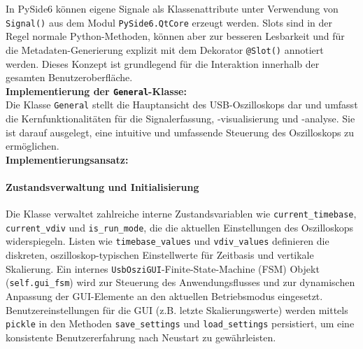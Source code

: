 \documentclass[a4paper, portrait, 12pt]{scrartcl} %
\begin{document}
In PySide6 können eigene Signale als Klassenattribute unter Verwendung von \texttt{Signal()} aus dem Modul \texttt{PySide6.QtCore} erzeugt werden. Slots sind in der Regel normale Python-Methoden, können aber zur besseren Lesbarkeit und für die Metadaten-Generierung explizit mit dem Dekorator \texttt{@Slot()} annotiert werden. Dieses Konzept ist grundlegend für die Interaktion innerhalb der gesamten Benutzeroberfläche.\\

\textbf{Implementierung der \texttt{General}-Klasse:}\\
Die Klasse \texttt{General} stellt die Hauptansicht des USB-Oszilloskops dar und umfasst die Kernfunktionalitäten für die Signalerfassung, -visualisierung und -analyse. Sie ist darauf ausgelegt, eine intuitive und umfassende Steuerung des Oszilloskops zu ermöglichen.\\

\textbf{Implementierungsansatz:}
\paragraph{Zustandsverwaltung und Initialisierung}
Die Klasse verwaltet zahlreiche interne Zustandsvariablen wie \texttt{current\_timebase}, \texttt{current\_vdiv} und \texttt{is\_run\_mode}, die die aktuellen Einstellungen des Oszilloskops widerspiegeln. Listen wie \texttt{timebase\_values} und \texttt{vdiv\_values} definieren die diskreten, oszilloskop-typischen Einstellwerte für Zeitbasis und vertikale Skalierung. Ein internes \texttt{UsbOsziGUI}-Finite-State-Machine (FSM) Objekt (\texttt{self.gui\_fsm}) wird zur Steuerung des Anwendungsflusses und zur dynamischen Anpassung der GUI-Elemente an den aktuellen Betriebsmodus eingesetzt. Benutzereinstellungen für die GUI (z.B. letzte Skalierungswerte) werden mittels \texttt{pickle} in den Methoden \texttt{save\_settings} und \texttt{load\_settings} persistiert, um eine konsistente Benutzererfahrung nach Neustart zu gewährleisten.
\end{document}
